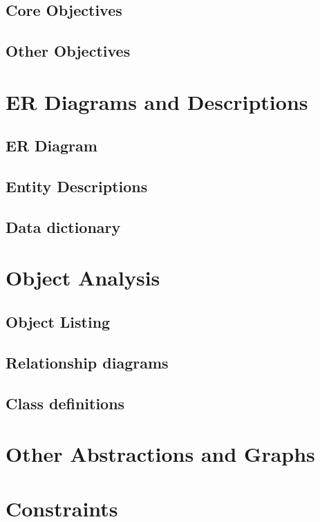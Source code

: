 \subsection{Core Objectives}

\subsection{Other Objectives}

\section{ER Diagrams and Descriptions}

\subsection{ER Diagram}

\subsection{Entity Descriptions}

\subsection{Data dictionary}

\section{Object Analysis}

\subsection{Object Listing}

\subsection{Relationship diagrams}

\subsection{Class definitions}

\section{Other Abstractions and Graphs}

\section{Constraints}

